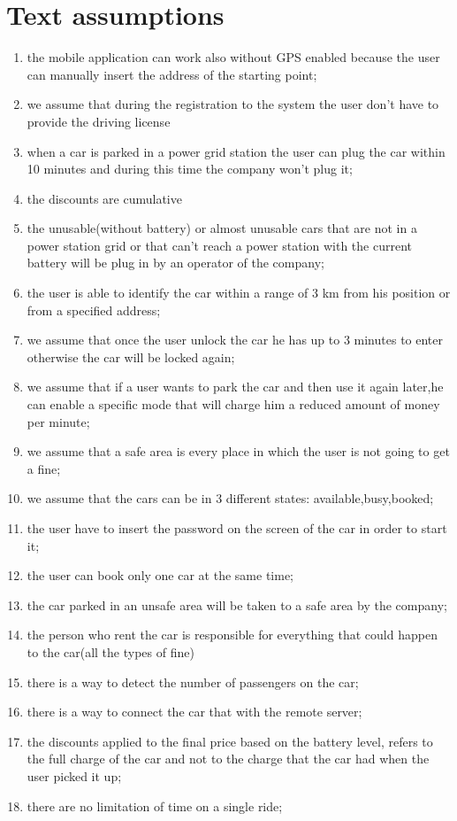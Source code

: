 \section{Text assumptions}
\begin{enumerate}
	\item the mobile application can work also without GPS enabled because the user can manually insert the address of the starting point;
	\item we assume that during the registration to the system the user don't have to provide the driving license
	\item when a car is parked in a power grid station the user can plug the car within 10 minutes and during this time the company won't plug it;
	\item the discounts are cumulative
	\item the unusable(without battery) or almost unusable cars that are not in a power station grid or that can't reach a power station with the current battery will be plug in by an operator of the company;
	\item the user is able to identify the car within a range of 3 km from his position or from a specified
	address;
	\item we assume that once the user unlock the car he has up to 3 minutes to enter otherwise the car will be locked again;
	\item we assume that if a user wants to park the car and then use it again later,he can enable a specific mode that will charge him a reduced amount of money per minute;
	\item we assume that a safe area is every  place in which the user is not going to get a fine;
	\item we assume that the cars can be in 3 different states: available,busy,booked;
	\item the user have to insert the password on the screen of the car in order to start it;
	\item the user can book only one car at the same time;
	\item the car parked in an unsafe area will be taken to a safe area by the company;
	\item the person who rent the car is responsible for everything that could happen to the car(all the types of fine)
	\item there is a way to detect the number of passengers on the car;
	\item there is a way to connect the car  that with the remote server;
	\item the discounts applied to the final price based on the battery level, refers to the full charge of the car and not to the charge that the car had when the user picked it up;
	\item there are no limitation of time on a single ride;
\end{enumerate}